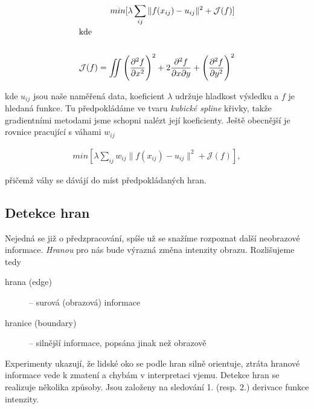 
\begin{eqnarray}
min[\lambda \sum\limits_{ij} \|f(x_{ij})-u_{ij}\|^2+\mathcal{J}(f)]\\
\noalign{\hbox{kde}\nonumber}\\
\mathcal{J}(f)=\int\!\!\!\!\int\left(\frac{\partial^2f}{\partial x^2}\right)^2+2\frac{\partial^2f}{\partial x\partial y}+
\left(\frac{\partial^2f}{\partial y^2}\right)^2
\end{eqnarray}

kde $u_{ij}$ jsou naše naměřená data, koeficient $\lambda$  udržuje  hladkost výsledku a $f$ je hledaná funkce.
Tu předpokládáme ve tvaru {\em kubické spline} křivky, takže gradientními metodami jsme schopni nalézt její koeficienty.
Ještě obecnější je rovnice pracující s váhami $w_{ij}$

\begin{eqnarray}
min[\lambda \sum\limits_{ij}w_{ij}\|f(x_{ij})-u_{ij}\|^2+\mathcal{J}(f)],
\end{eqnarray}

přičemž váhy se dávájí do míst předpokládaných hran.

\subsection{Detekce hran}
Nejedná se již o předzpracování, spíše už se snažíme rozpoznat další neobrazové informace. {\em Hranou}  pro nás bude
výrazná změna intenzity obrazu. Rozlišujeme tedy

\begin{description}
\item[hrana (edge)] -- surová (obrazová) informace
\item[hranice (boundary)] -- silnější informace, popsána jinak než obrazově
\end{description}

Experimenty ukazují, že lidské oko se podle hran silně orientuje, ztráta hranové informace vede k zmatení a chybám v 
interpretaci vjemu. Detekce hran se realizuje několika způsoby. Jsou založeny na sledování 1. (resp. 2.) derivace
funkce intenzity.


